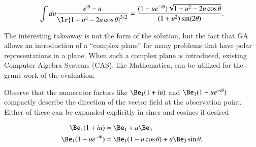 \begin{dmath}\label{eqn:linecharge:100}
\int
du \frac{ e^{i\theta} - u }{ \lr{ 1 + u^2 - 2 u \cos\theta }^{3/2} }
= \frac{(1 -u e^{-i\theta}) \sqrt{1 + u^2 - 2 u \cos\theta}}{(1 + u^2) \sin(2\theta)}.
\end{dmath}

The interesting takeaway is not the form of the solution, but the fact that GA allows an introduction of a ``complex plane'' for many problems that have polar representations in a plane.
When such a complex plane is introduced,
existing Computer Algebra Systems (CAS), like Mathematica, can be utilized for the grunt work of the evaluation.

Observe that the numerator factors like \( \Be_1 (1 + i u) \) and \( \Be_1(1 - u e^{-i\theta}) \)
compactly describe the direction of the vector field at the observation point.
Either of these can be expanded explicitly in sines and cosines if desired

\begin{dmath}\label{eqn:linecharge:140}
\begin{aligned}
\Be_1 (1 + i u) &= \Be_1 + u \Be_3 \\
\Be_1(1 - u e^{-i\theta}) &= \Be_1(1 - u \cos\theta) + u \Be_3 \sin\theta.
\end{aligned}
\end{dmath}

